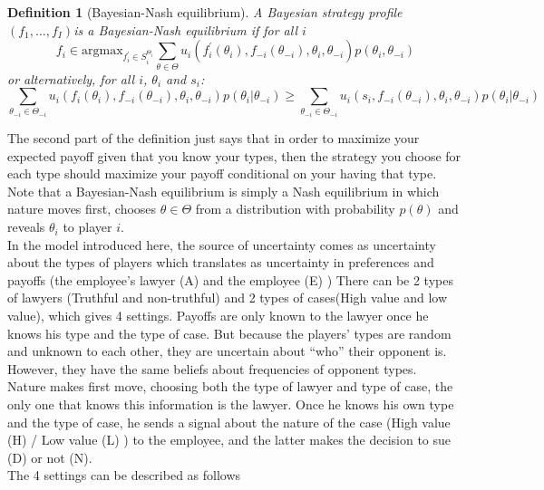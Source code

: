 \documentclass[10pt]{article}
\newtheorem{dfn}{Definition}
\begin{document}
\begin{dfn}[Bayesian-Nash equilibrium] A Bayesian strategy profile $(f_1,\ldots, f_I)$is a Bayesian-Nash equilibrium if for all $i$
\[f_i\in \text{argmax}_{f_{i}^{\prime}\in S_{i}^{\Theta_i}} \sum_{\theta\in \Theta} u_i\left(f_{i}^{\prime}(\theta_i), f_{-i}(\theta_{-i}),\theta_i, \theta_{-i}\right)p(\theta_i,\theta_{-i})\]
or alternatively, for all $i$, $\theta_i$ and $s_i$:
\[\sum_{\theta_{-i}\in \Theta_{-i}} u_i\left(f_{i}(\theta_i), f_{-i}(\theta_{-i}),\theta_i, \theta_{-i} \right) p(\theta_i|\theta_{-i})\geq \sum_{\theta_{-i}\in \Theta_{-i}} u_i\left(s_i, f_{-i}(\theta_{-i}),\theta_i, \theta_{-i} \right) p(\theta_i|\theta_{-i})\]
\end{dfn}

The second part of the definition just says that in order to maximize your expected payoff given that you know your types, then the strategy you choose for each type should maximize your payoff conditional on your having that type. Note that a Bayesian-Nash equilibrium is simply a Nash equilibrium in which nature moves first, chooses $\theta\in \Theta$ from a distribution with probability $p(\theta)$ and reveals $\theta_i$ to player $i$.\\

In the model introduced here, the source of uncertainty comes  as uncertainty about the types of players which translates as uncertainty in preferences and payoffs (the employee's lawyer (A)  and the employee (E) ) There can be 2 types of lawyers (Truthful and non-truthful) and 2 types of cases(High value and low value), which gives 4 settings. Payoffs are only known to the lawyer once he knows his type and the type of case. But because the players’ types are random and unknown to each other, they are uncertain about “who” their opponent is. However, they have the same beliefs about frequencies of opponent types.\\

Nature makes first move, choosing both the type of lawyer and type of case, the only one that knows this information is the lawyer. Once he knows his own type and the type of case, he sends a signal about the nature of the case (High value (H) / Low value (L) ) to the employee, and the latter makes the decision to sue (D) or not (N). \\

The 4 settings can be described as follows 
\end{document}
